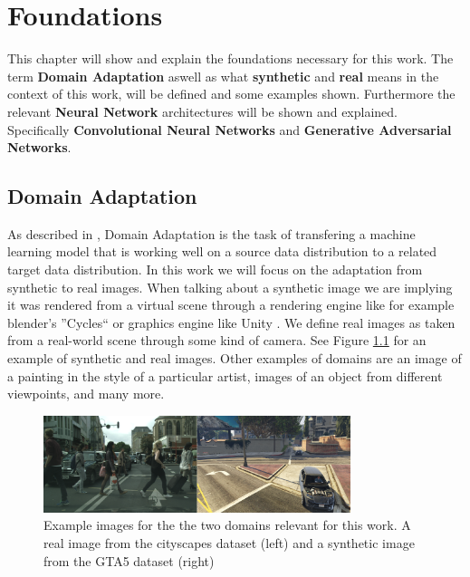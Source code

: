\chapter{Foundations}
\label{sec:foundations}

This chapter will show and explain the foundations necessary for this work. The term \textbf{Domain Adaptation} aswell as what \textbf{synthetic} and \textbf{real} means in the context of this work, will be defined and some examples shown. Furthermore the relevant \textbf{Neural Network} architectures will be shown and explained. Specifically \textbf{Convolutional Neural Networks} and \textbf{Generative Adversarial Networks}.


\section{Domain Adaptation}
As described in \cite{DBLP:journals/corr/Csurka17},
Domain Adaptation is the task of transfering a machine learning model that is working well on a source data distribution to a related target data distribution. In this work we will focus on the adaptation from synthetic to real images. When talking about a synthetic image we are implying it was rendered from a virtual scene through a rendering engine like for example blender's ''Cycles`` \cite{Cycles} or graphics engine like Unity \cite{Unity}. We define real images as taken from a real-world scene through some kind of camera. See Figure \ref{fig:DA_examples} for an example of synthetic and real images. Other examples of domains are an image of a painting in the style of a particular artist, images of an object from different viewpoints, and many more. 

\begin{figure}
	\centering
	 \includegraphics[width=0.8\textwidth]{../images/DA_examples_cityscapes_gta.png}
	\caption{Example images for the the two domains relevant for this work. A real image from the cityscapes dataset \cite{Cordts_2016_CVPR} (left) and a synthetic image from the GTA5 dataset \cite{Richter_2016_ECCV} (right)}
	\label{fig:DA_examples}
\end{figure}

